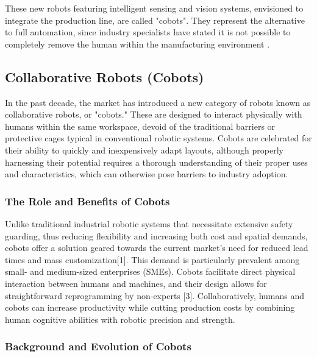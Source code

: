 These new robots featuring intelligent sensing and vision systems, envisioned to integrate the production line, are called "cobots". 
They represent the alternative to full automation, since industry specialists have stated it is not possible to completely remove the 
human within the manufacturing environment \cite{Weiss2021}.


\subsection{Collaborative Robots (Cobots)} 


In the past decade, the market has introduced a new category of robots known as collaborative robots, or "cobots." These are designed to interact 
physically with humans within the same workspace, devoid of the traditional barriers or protective cages typical in conventional robotic systems. 
Cobots are celebrated for their ability to quickly and inexpensively adapt layouts, although properly harnessing their potential requires a thorough 
understanding of their proper uses and characteristics, which can otherwise pose barriers to industry adoption.


\subsubsection{The Role and Benefits of Cobots}

Unlike traditional industrial robotic systems that necessitate extensive safety guarding, thus reducing flexibility and increasing both cost and 
spatial demands, cobots offer a solution geared towards the current market's need for reduced lead times and mass customization[1]. This demand is 
particularly prevalent among small- and medium-sized enterprises (SMEs). Cobots facilitate direct physical interaction between humans and machines, 
and their design allows for straightforward reprogramming by non-experts [3]. Collaboratively, humans and cobots can increase productivity while 
cutting production costs by combining human cognitive abilities with robotic precision and strength.

\subsubsection{Background and Evolution of Cobots}

